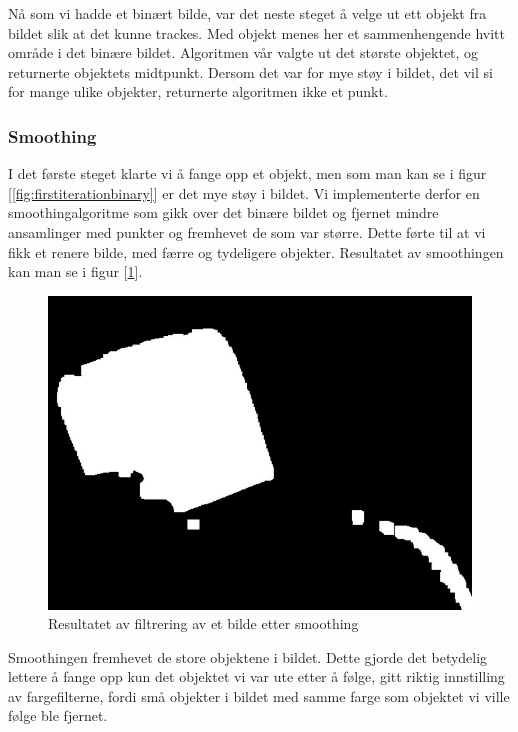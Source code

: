 Nå som vi hadde et binært bilde, var det neste steget å velge ut ett objekt fra bildet slik at det kunne trackes. Med objekt menes her et sammenhengende hvitt område i det binære bildet. Algoritmen vår valgte ut det største objektet, og returnerte objektets midtpunkt. Dersom det var for mye støy i bildet, det vil si for mange ulike objekter, returnerte algoritmen ikke et punkt.

\subsubsection{Smoothing}

I det første steget klarte vi å fange opp et objekt, men som man kan se i figur [\ref{fig:firstiterationbinary}] er det mye støy i bildet. Vi implementerte derfor en smoothingalgoritme som gikk over det binære bildet og fjernet mindre ansamlinger med punkter og fremhevet de som var større. Dette førte til at vi fikk et renere bilde, med færre og tydeligere objekter. Resultatet av smoothingen kan man se i figur [\ref{fig:seconditerationbinary}].

\begin{figure}[h!]
	\centering
	\includegraphics[scale=0.45]{img/second-binary.jpg}
	\caption[Andre iterasjon binært bilde]{Resultatet av filtrering av et bilde etter smoothing}
	\label{fig:seconditerationbinary}
\end{figure}

Smoothingen fremhevet de store objektene i bildet. Dette gjorde det betydelig lettere å fange opp kun det objektet vi var ute etter å følge, gitt riktig innstilling av fargefilterne, fordi små objekter i bildet med samme farge som objektet vi ville følge ble fjernet.

